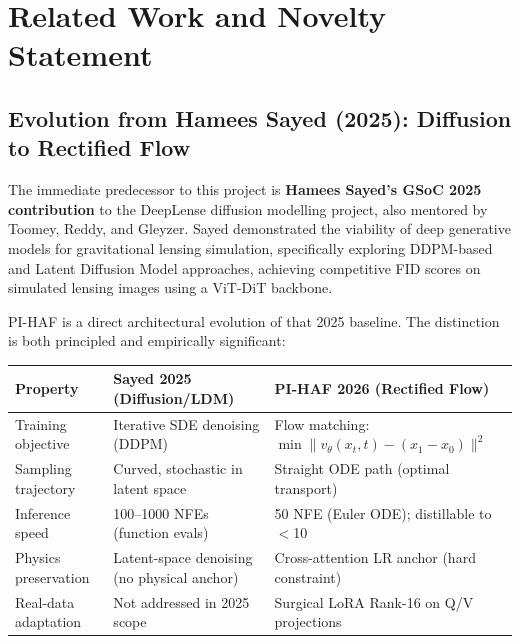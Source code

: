 \documentclass[11pt,a4paper]{article}
\newcommand{\vtheta}{v_\theta}
\newcommand{\xt}{x_t}
\newcommand{\xzero}{x_0}
\newcommand{\xone}{x_1}
\begin{document}
\vspace{6pt}

\section{Related Work and Novelty Statement}

\subsection{Evolution from Hamees Sayed (2025): Diffusion to Rectified Flow}

The immediate predecessor to this project is \textbf{Hamees Sayed's GSoC 2025 contribution} to the DeepLense diffusion modelling project, also mentored by Toomey, Reddy, and Gleyzer. Sayed demonstrated the viability of deep generative models for gravitational lensing simulation, specifically exploring DDPM-based and Latent Diffusion Model approaches, achieving competitive FID scores on simulated lensing images using a ViT-DiT backbone.

PI-HAF is a direct architectural evolution of that 2025 baseline. The distinction is both principled and empirically significant:

\vspace{4pt}
\begin{center}
\small
\begin{tabular}{L{3.2cm} L{5.3cm} L{5.3cm}}
\toprule
\textbf{Property} & \textbf{Sayed 2025 (Diffusion/LDM)} & \textbf{PI-HAF 2026 (Rectified Flow)} \\
\midrule
Training objective & Iterative SDE denoising (DDPM) & Flow matching: $\min\|\vtheta(\xt,t) - (\xone-\xzero)\|^2$ \\
Sampling trajectory & Curved, stochastic in latent space & Straight ODE path (optimal transport) \\
Inference speed & 100--1000 NFEs (function evals) & 50 NFE (Euler ODE); distillable to $<$10 \\
Physics preservation & Latent-space denoising (no physical anchor) & Cross-attention LR anchor (hard constraint) \\
Real-data adaptation & Not addressed in 2025 scope & Surgical LoRA Rank-16 on Q/V projections \\
\bottomrule
\end{tabular}
\normalsize
\end{center}
\vspace{4pt}
\end{document}
